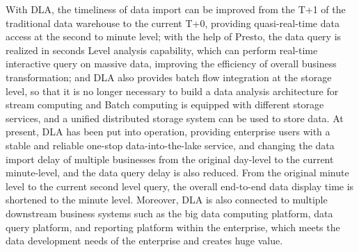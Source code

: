 \begin{abstract*}
With DLA, the timeliness of data import can be improved from the T+1 of the traditional
data warehouse to the current T+0, providing quasi-real-time data access at the second to
minute level; with the help of Presto, the data query is realized in seconds Level analysis
capability, which can perform real-time interactive query on massive data, improving the
efficiency of overall business transformation; and DLA also provides batch flow integration
at the storage level, so that it is no longer necessary to build a data analysis architecture
for stream computing and Batch computing is equipped with different storage services, and a
unified distributed storage system can be used to store data. At present, DLA has been put
into operation, providing enterprise users with a stable and reliable one-stop data-into-the-lake
service, and changing the data import delay of multiple businesses from the original day-level
to the current minute-level, and the data query delay is also reduced. From the original minute
level to the current second level query, the overall end-to-end data display time is shortened
to the minute level. Moreover, DLA is also connected to multiple downstream business systems
such as the big data computing platform, data query platform, and reporting platform within the
enterprise, which meets the data development needs of the enterprise and creates huge value.

\end{abstract*}
